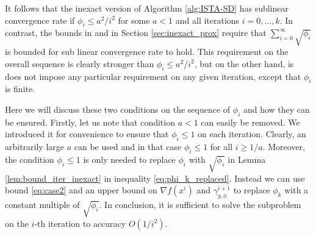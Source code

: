 \documentclass[11pt]{article}
\numberwithin{equation}{section}
\begin{document}
It follows that the inexact version of Algorithm \ref{alg:ISTA-SD}   has sublinear convergence rate if 
$\phi_i\leq a^2/i^2$  for some $a<1$ and all iterations $i=0, \ldots, k$. 
In contrast,  the bounds in \cite{Schmidtetal} and in Section \ref{sec:inexact_prox} 
require that $\sum_{i=0}^{\infty} \sqrt{\phi_i}$ is  bounded for sub linear convergence rate to hold. 
This requirement on the overall sequence is clearly 
stronger than $\phi_i\leq a^2/i^2$, but on the other hand, is does not impose any particular requirement on any given iteration, except that 
$\phi_i$ is finite. 

Here we will discuss these two conditions on the sequence of $\phi_i$ and how they can be ensured. Firstly, let us note that condition $a<1$ can easily be removed. 
We introduced it for convenience to ensure that $\phi_i\leq 1$ on each iteration. Clearly, an arbitrarily large $a$ can be used and in that case
$\phi_i\leq 1$ for all $i\geq 1/a$. Moreover, the condition $\phi_i\leq 1$ is only needed to replace $\phi_i$ with $\sqrt{\phi_i}$ in 
Lemma \ref{lem:bound_iter_inexact} in inequality \eqref{eq:phi_k_replaced}. Instead we can use bound \eqref{eq:case2} and an upper bound 
on $\nabla f(x^i)$ and $\gamma^{i+1}_{g,\phi}$ to replace $\phi_k$ with a constant multiple of $\sqrt{\phi_i}$. 
In conclusion, it is sufficient to solve the subproblem on the $i$-th iteration to accuracy $O(1/i^2)$. 
\end{document}
